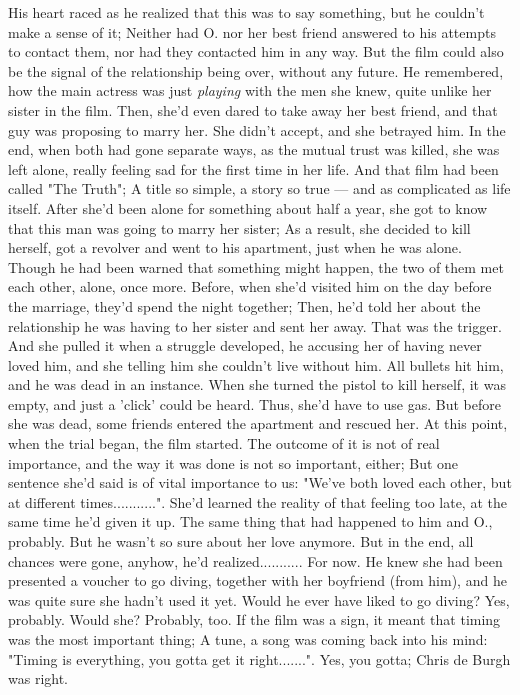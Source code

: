 His heart raced as he realized that this was to say something, but he couldn't make a sense of it; Neither had O. nor her best friend answered to his attempts to contact them, nor had they contacted him in any way. 
But the film could also be the signal of the relationship being over, without any future. 
He remembered, how the main actress was just \emph{playing} with the men she knew, quite unlike her sister in the film. Then, she'd even dared to take away her best friend, and that guy was proposing to marry her. 
She didn't accept, and she betrayed him. In the end, when both had gone separate ways, as the mutual trust was killed, she was left alone, really feeling sad for the first time in her life. And that film had been called "The Truth"; A title so simple, a story so true --- and as complicated as life itself. 
After she'd been alone for something about half a year, she got to know that this man was going to marry her sister; As a result, she decided to kill herself, got a revolver and went to his apartment, just when he was alone. Though he had been warned that something might happen, the two of them met each other, alone, once more. Before, when she'd visited him on the day before the marriage, they'd spend the night together; Then, he'd told her about the relationship he was having to her sister and sent her away. 
That was the trigger. 
And she pulled it when a struggle developed, he accusing her of having never loved him, and she telling him she couldn't live without him. 
All bullets hit him, and he was dead in an instance. When she turned the pistol to kill herself, it was empty, and just a 'click' could be heard. 
Thus, she'd have to use gas. 
But before she was dead, some friends entered the apartment and rescued her. 
At this point, when the trial began, the film started. 
The outcome of it is not of real importance, and the way it was done is not so important, either; But one sentence she'd said is of vital importance to us: "We've both loved each other, but at different times...........". 
She'd learned the reality of that feeling too late, at the same time he'd given it up. 
The same thing that had happened to him and O., probably. But he wasn't so sure about her love anymore. 
But in the end, all chances were gone, anyhow, he'd realized...........
For now. 
He knew she had been presented a voucher to go diving, together with her boyfriend (from him), and he was quite sure she hadn't used it yet. Would he ever have liked to go diving? Yes, probably. 
Would she? Probably, too. 
If the film was a sign, it meant that timing was the most important thing; A tune, a song was coming back into his mind: "Timing is everything, you gotta get it right.......". Yes, you gotta; Chris de Burgh was right. 

